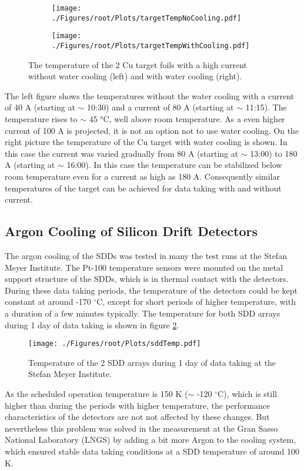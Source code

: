 \begin{figure}[h]
 \centering
 \begin{subfigure}{.49\textwidth}
 \centering
 \texttt{[image: ./Figures/root/Plots/targetTempNoCooling.pdf]}
 \end{subfigure}
 \hfill
 \begin{subfigure}{.49\textwidth}
 \centering
 \texttt{[image: ./Figures/root/Plots/targetTempWithCooling.pdf]}
 \end{subfigure}
 \caption{The temperature of the 2 Cu target foils with a high current without water cooling (left) and with water cooling (right).}
 \label{fig:waterCooling}
\end{figure}
The left figure shows the temperatures without the water cooling with a current of 40 A (starting at $\sim$ 10:30) and a current of 80 A (starting at $\sim$ 11:15). The temperature rises to $\sim$ 45 °C, well above room temperature. As a even higher current of 100 A is projected, it is not an option not to use water cooling. On the right picture the temperature of the Cu target with water cooling is shown. In this case the current was varied gradually from 80 A (starting at $\sim$ 13:00) to 180 A (starting at $\sim$ 16:00). In this case the temperature can be stabilized below room temperature even for a current as high as 180 A. Consequently similar temperatures of the target can be achieved for data taking with and without current.

\subsection{Argon Cooling of Silicon Drift Detectors}

The argon cooling of the SDDs was tested in many the test runs at the Stefan Meyer Institute. The Pt-100 temperature sensors were mounted on the metal  support structure of the SDDs, which is in thermal contact with the detectors. During these data taking periods, the temperature of the detectors could be kept constant at around -170 $^{\circ}$C, except for short periods of higher temperature, with a duration of a few minutes typically. The temperature for both SDD arrays during 1 day of data taking is shown in figure \ref{fig:sddTemp}.
\begin{figure}[h]
 \centering
 \texttt{[image: ./Figures/root/Plots/sddTemp.pdf]}
 \caption{Temperature of the 2 SDD arrays during 1 day of data taking at the Stefan Meyer Institute.}
 \label{fig:sddTemp}
\end{figure}
As the scheduled operation temperature is 150 K \cite{Lechner} ($\sim$ -120 $^{\circ}$C), which is still higher than during the periods with higher temperature, the performance characteristics of the detectors are not not affected by these changes. But nevertheless this problem was solved in the measurement at the Gran Sasso National Laboratory (LNGS) by adding a bit more Argon to the cooling system, which ensured stable data taking conditions at a SDD temperature of around 100 K.

